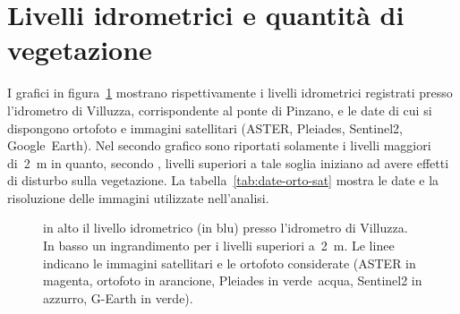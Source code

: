\documentclass[12pt,a4paper]{article}
\begin{document}
\section{Livelli idrometrici e quantità di vegetazione}
I grafici in figura~\ref{graph:livelli-orto-sat} mostrano rispettivamente i livelli idrometrici registrati presso l'idrometro di Villuzza, corrispondente al ponte di Pinzano, e le date di cui si dispongono ortofoto e immagini satellitari (ASTER, Pleiades, Sentinel2, Google~Earth). 
Nel secondo grafico sono riportati solamente i livelli maggiori di~\SI{2}{\m} in quanto, secondo \cite{Bertoldi:2009-2m}, livelli superiori a tale soglia iniziano ad avere effetti di disturbo sulla vegetazione.
La tabella~\ref{tab:date-orto-sat} mostra le date e la risoluzione delle immagini utilizzate nell'analisi.

\begin{figure}[ht]
	\centering
	
	
	\caption[livelli idrometrici e foto aeree - satellitari]{in alto il livello idrometrico (in blu) presso l'idrometro di Villuzza. 
	In basso un ingrandimento per i livelli superiori a~\SI{2}{\m}. Le linee indicano le immagini satellitari e le ortofoto considerate (ASTER in magenta, ortofoto in arancione, Pleiades in verde~acqua, Sentinel2 in azzurro, G-Earth in verde).}
	\label{graph:livelli-orto-sat}
\end{figure}
\end{document}
